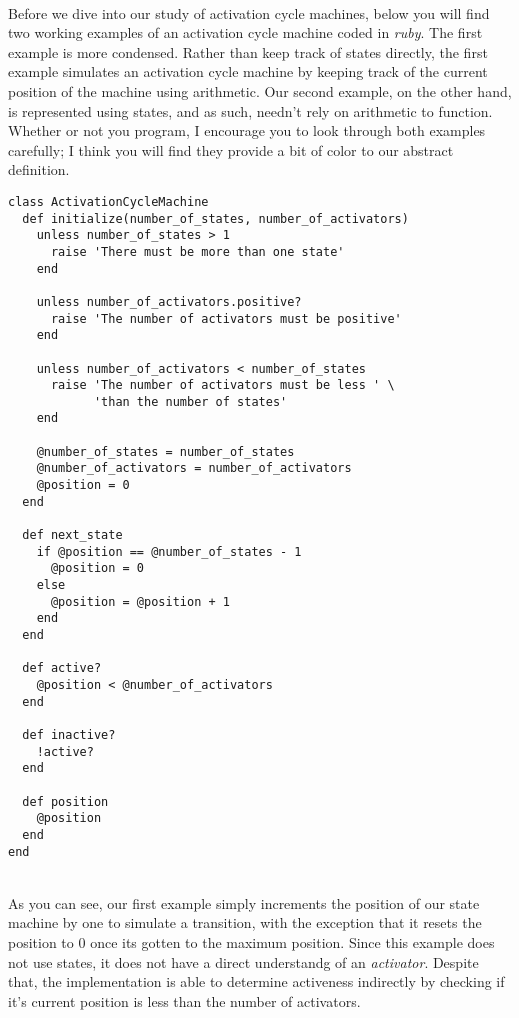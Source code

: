 \documentclass[a4paper,12pt]{article}
\begin{document}
\\
Before we dive into our study of activation cycle machines, below you will find two working examples of an activation cycle machine coded in \textit{ruby}. The first example is more condensed. Rather than keep track of states directly, the first example simulates an activation cycle machine by keeping track of the current position of the machine using arithmetic. Our second example, on the other hand, is represented using states, and as such, needn't rely on arithmetic to function. Whether or not you program, I encourage you to look through both examples carefully; I think you will find they provide a bit of color to our abstract definition.
\begin{tcolorbox}
\begin{verbatim}
class ActivationCycleMachine
  def initialize(number_of_states, number_of_activators)    
    unless number_of_states > 1
      raise 'There must be more than one state'
    end
    
    unless number_of_activators.positive?
      raise 'The number of activators must be positive'
    end
    
    unless number_of_activators < number_of_states
      raise 'The number of activators must be less ' \
            'than the number of states'
    end
    
    @number_of_states = number_of_states
    @number_of_activators = number_of_activators
    @position = 0
  end

  def next_state
    if @position == @number_of_states - 1
      @position = 0
    else
      @position = @position + 1
    end
  end
  
  def active?
    @position < @number_of_activators
  end
  
  def inactive?
    !active?
  end
  
  def position
    @position
  end
end
\end{verbatim}
\end{tcolorbox}
\noindent
\\
As you can see, our first example simply increments the position of our state machine by one to simulate a transition, with the exception that it resets the position to 0 once its gotten to the maximum position. Since this example does not use states, it does not have a direct understandg of an \textit{activator}. Despite that, the implementation is able to determine activeness indirectly by checking if it's current position is less than the number of activators.\\
\end{document}
